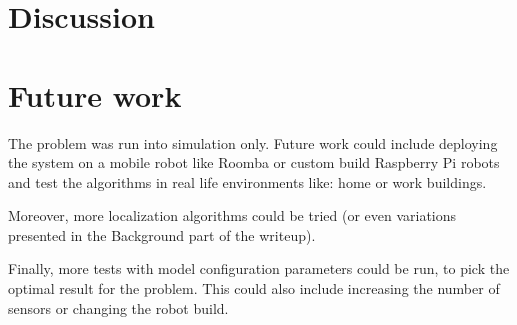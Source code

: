 \documentclass[10pt,journal,compsoc]{IEEEtran}
\begin{document}
    \section{Discussion}

    \section{Future work}

    The problem was run into simulation only. Future work could include deploying the system on a mobile robot like Roomba or custom build Raspberry Pi robots and test the algorithms in real life environments like: home or work buildings.

    Moreover, more localization algorithms could be tried (or even variations presented in the Background part of the writeup).

    Finally, more tests with model configuration parameters could be run, to pick the optimal result for the problem. This could also include increasing the number of sensors or changing the robot build.
    
   
   
\end{document}
